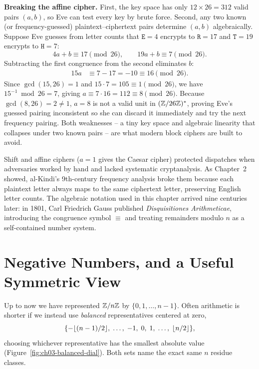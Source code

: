 \begin{attackbox}
\textbf{Breaking the affine cipher.} First, the key space has only $12 \times 26 = 312$ valid pairs $(a, b)$, so Eve can test every key by brute force. Second, any two known (or frequency-guessed) plaintext--ciphertext pairs determine $(a, b)$ algebraically. Suppose Eve guesses from letter counts that $\texttt{E} = 4$ encrypts to $\texttt{R} = 17$ and $\texttt{T} = 19$ encrypts to $\texttt{H} = 7$:
\[
  4a + b \equiv 17 \pmod{26}, \qquad 19a + b \equiv 7 \pmod{26}.
\]
Subtracting the first congruence from the second eliminates $b$:
\begin{align*}
  15a &\equiv 7 - 17 = -10 \equiv 16 \pmod{26}.
\end{align*}
Since $\gcd(15,26)=1$ and $15\cdot 7 = 105 \equiv 1 \pmod{26}$, we have $15^{-1} \bmod 26 = 7$, giving $a \equiv 7\cdot 16 = 112 \equiv 8 \pmod{26}$. Because $\gcd(8,26) = 2 \ne 1$, $a = 8$ is not a valid unit in $(\mathbb{Z}/26\mathbb{Z})^{*}$, proving Eve's guessed pairing inconsistent so she can discard it immediately and try the next frequency pairing. Both weaknesses -- a tiny key space and algebraic linearity that collapses under two known pairs -- are what modern block ciphers are built to avoid.
\end{attackbox}

\begin{historybox}
Shift and affine ciphers ($a = 1$ gives the Caesar cipher) protected dispatches when adversaries worked by hand and lacked systematic cryptanalysis. As Chapter~2 showed, al-Kindi's 9th-century frequency analysis broke them because each plaintext letter always maps to the same ciphertext letter, preserving English letter counts. The algebraic notation used in this chapter arrived nine centuries later: in 1801, Carl Friedrich Gauss published \emph{Disquisitiones Arithmeticae}, introducing the congruence symbol $\equiv$ and treating remainders modulo $n$ as a self-contained number system.
\end{historybox}

\section{Negative Numbers, and a Useful Symmetric View}

Up to now we have represented $\mathbb{Z}/n\mathbb{Z}$ by $\{0,1,\dots,n-1\}$. Often arithmetic is shorter if we instead use \emph{balanced} representatives centered at zero,
\[
  \{-\lfloor(n-1)/2\rfloor,\; \dots,\; -1,\; 0,\; 1,\; \dots,\; \lfloor n/2\rfloor\},
\]
choosing whichever representative has the smallest absolute value (Figure~\ref{fig:ch03-balanced-dial}). Both sets name the exact same $n$ residue classes.

